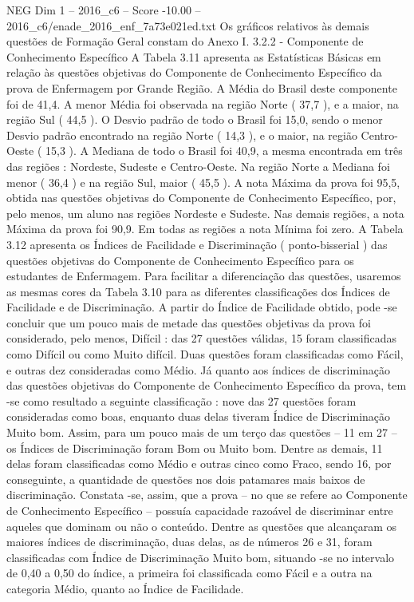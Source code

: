\begin{textsample}{NEG Dim 1 – 2016\_c6 – Score -10.00 – 2016\_c6/enade\_2016\_enf\_7a73e021ed.txt}
Os gráficos relativos às demais questões de Formação Geral constam do Anexo I. 3.2.2 - Componente de Conhecimento Específico A Tabela 3.11 apresenta as Estatísticas Básicas em relação às questões objetivas do Componente de Conhecimento Específico da prova de Enfermagem por Grande Região.
A Média do Brasil deste componente foi de 41,4.
A menor Média foi observada na região Norte ( 37,7 ), e a maior, na região Sul ( 44,5 ).
O Desvio padrão de todo o Brasil foi 15,0, sendo o menor Desvio padrão encontrado na região Norte ( 14,3 ), e o maior, na região Centro-Oeste ( 15,3 ).
A Mediana de todo o Brasil foi 40,9, a mesma encontrada em três das regiões : Nordeste, Sudeste e Centro-Oeste.
Na região Norte a Mediana foi menor ( 36,4 ) e na região Sul, maior ( 45,5 ).
A nota Máxima da prova foi 95,5, obtida nas questões objetivas do Componente de Conhecimento Específico, por, pelo menos, um aluno nas regiões Nordeste e Sudeste.
Nas demais regiões, a nota Máxima da prova foi 90,9.
Em todas as regiões a nota Mínima foi zero.
A Tabela 3.12 apresenta os Índices de Facilidade e Discriminação ( ponto-bisserial ) das questões objetivas do Componente de Conhecimento Específico para os estudantes de Enfermagem.
Para facilitar a diferenciação das questões, usaremos as mesmas cores da Tabela 3.10 para as diferentes classificações dos Índices de Facilidade e de Discriminação.
A partir do Índice de Facilidade obtido, pode -se concluir que um pouco mais de metade das questões objetivas da prova foi considerado, pelo menos, Difícil : das 27 questões válidas, 15 foram classificadas como Difícil ou como Muito difícil.
Duas questões foram classificadas como Fácil, e outras dez consideradas como Médio.
Já quanto aos índices de discriminação das questões objetivas do Componente de Conhecimento Específico da prova, tem -se como resultado a seguinte classificação : nove das 27 questões foram consideradas como boas, enquanto duas delas tiveram Índice de Discriminação Muito bom.
Assim, para um pouco mais de um terço das questões – 11 em 27 – os Índices de Discriminação foram Bom ou Muito bom.
Dentre as demais, 11 delas foram classificadas como Médio e outras cinco como Fraco, sendo 16, por conseguinte, a quantidade de questões nos dois patamares mais baixos de discriminação.
Constata -se, assim, que a prova – no que se refere ao Componente de Conhecimento Específico – possuía capacidade razoável de discriminar entre aqueles que dominam ou não o conteúdo.
Dentre as questões que alcançaram os maiores índices de discriminação, duas delas, as de números 26 e 31, foram classificadas com Índice de Discriminação Muito bom, situando -se no intervalo de 0,40 a 0,50 do índice, a primeira foi classificada como Fácil e a outra na categoria Médio, quanto ao Índice de Facilidade.

\end{textsample}
